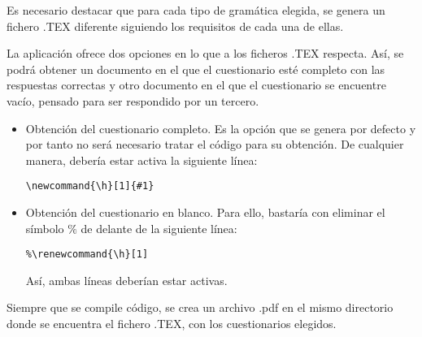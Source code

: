 
Es necesario destacar que para cada tipo de gramática elegida, se genera un fichero .TEX diferente siguiendo los requisitos de cada una de ellas. 

La aplicación ofrece dos opciones en lo que a los ficheros .TEX respecta. Así, se podrá obtener un documento en el que el cuestionario esté completo con las respuestas correctas y otro documento en el que el cuestionario se encuentre vacío, pensado para ser respondido por un tercero.

\begin{itemize}
\item Obtención del cuestionario completo. Es la opción que se genera por defecto y por tanto no será necesario tratar el código para su obtención. De cualquier manera, debería estar activa la siguiente línea:
\begin{verbatim}
\newcommand{\h}[1]{#1}
\end{verbatim}
\item Obtención del cuestionario en blanco. Para ello, bastaría con eliminar el símbolo $\%$ de delante de la siguiente línea:

\begin{verbatim}
%\renewcommand{\h}[1]
\end{verbatim}

Así, ambas líneas deberían estar activas.

\end{itemize}

Siempre que se compile código, se crea un archivo .pdf en el mismo directorio donde se encuentra el fichero .TEX, con los cuestionarios elegidos.